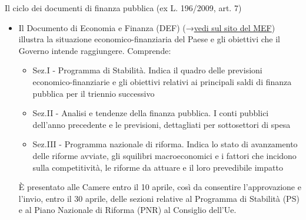 \documentclass[aspectratio=149,11pt,italian]{beamer}
\begin{document}
\begin{frame}{Il ciclo dei documenti di finanza pubblica (ex L. 196/2009, art. 7)}

  \begin{itemize}
  \item Il \alert{Documento di Economia e Finanza (DEF)}
    (→\href{http://www.mef.gov.it/documenti-pubblicazioni/doc-finanza-pubblica/index.html}{vedi sul sito del MEF})
    illustra la situazione economico-finanziaria del Paese e gli obiettivi che
    il Governo intende raggiungere. Comprende:
    \begin{itemize}
    \item \alert{Sez.I - Programma di Stabilità}. Indica il quadro delle
      previsioni economico-finanziarie e gli obiettivi relativi ai principali
      saldi di finanza pubblica per il triennio successivo
    \item \alert{Sez.II - Analisi e tendenze della finanza pubblica.} I conti
      pubblici dell'anno precedente e le previsioni, dettagliati per
      sottosettori di spesa
    \item \alert{Sez.III - Programma nazionale di riforma.} Indica lo stato di
      avanzamento delle riforme avviate, gli squilibri macroeconomici e i
      fattori che incidono sulla competitività, le riforme da attuare e il
      loro prevedibile impatto
    \end{itemize}
    È presentato alle Camere entro il 10 aprile, così da consentire l’approvazione
    e l’invio, entro il 30 aprile, delle sezioni relative al Programma di
    Stabilità (PS) e al Piano Nazionale di Riforma (PNR) al Consiglio dell’Ue.
  \end{itemize}
\end{frame}
\end{document}
